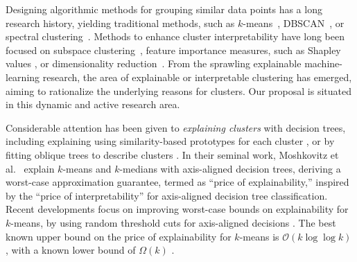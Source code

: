 \documentclass[a4paper,11pt]{article}
\begin{document}
Designing algorithmic methods for grouping similar data points has a long research history,
yielding traditional methods, 
such as $k$-means~\cite{macqueen1967some}, 
DBSCAN~\cite{ester1996ada}, or spectral clustering~\cite{ng2001spectral}.
Methods to enhance cluster interpretability have long been focused on subspace clustering~\cite{rubinstein2010dict}, 
feature importance measures, such as Shapley values \cite{lundberg2017unified}, 
or dimensionality reduction~\cite{hinton2002tsne,mcinnes2018umap}.
From the sprawling explainable machine-learning research, the area of explainable or interpretable clustering has emerged, aiming to rationalize the underlying reasons for clusters. 
Our proposal is situated in this dynamic and active research area. 

Considerable attention has been given to \emph{explaining clusters} with decision trees, 
including explaining using similarity-based prototypes for each cluster \cite{carrizosa2022interpreting}, 
or by fitting oblique trees to describe clusters \cite{gabidolla2022optimal}.
In their seminal work, Moshkovitz et al.~\cite{moshkovitz2020explainable} 
explain $k$-means and $k$-medians with axis-aligned decision trees, 
deriving a worst-case approximation guarantee, termed as ``price of explainability,'' 
inspired by the ``price of interpretability'' \cite{bertsimas2019price} for axis-aligned decision tree classification. 
Recent developments focus on improving worst-case bounds on explainability for $k$-means, 
by using random threshold cuts for axis-aligned decisions 
\cite{esfandiari2022almost, makarychev2022explainable}. 
The best known upper bound on the price of explainability for $k$-means is 
$\mathcal{O}(k \log \log k)$ \cite{gupta2023price}, 
with a known lower bound of $\Omega(k)$ \cite{gamlath2021explainable}.
\end{document}
